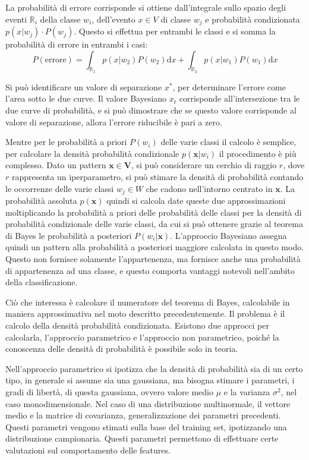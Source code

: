 \documentclass{article}
\numberwithin{equation}{subsection}
\newcommand{\vect}[1]{\boldsymbol{\mathbf{#1}}}
\begin{document}
La probabilità di errore corrisponde si ottiene dall'integrale sullo spazio degli eventi $\mathbb{R}_i$ della classe $w_i$, dell'evento $x\in V$ di classe $w_j$ e probabilità condizionata $p(x|w_j)\cdot P(w_j)$. Questo si effettua per entrambi le classi e si somma la probabilità di errore in entrambi i casi:
\begin{equation*}
    P(\text{errore})=\displaystyle\int_{\mathbb{R}_1}p(x|w_2)P(w_2)\text{d}x+\int_{\mathbb{R}_2}p(x|w_1)P(w_1)\text{d}x
\end{equation*}


Si può identificare un valore di separazione $x^*$, per determinare l'errore come l'area sotto le due curve. Il valore Bayesiano $x_t$ corrisponde all'intersezione tra le due curve di probabilità, e si può dimostrare che se questo valore corrisponde al valore di separazione, allora l'errore riducibile è pari a zero. 

Mentre per le probabilità a priori $P(w_i)$ delle varie classi il calcolo è semplice, 
per calcolare la densità probabilità condizionale $p(\vect{x}|w_i)$ il procedimento è più complesso. Dato un pattern $\vect{x}\in\vect{V}$, si può considerare un cerchio di raggio $r$, dove $r$ rappresenta un iperparametro, si può stimare la densità di probabilità contando le occorrenze delle varie classi $w_j\in W$ che cadono nell'intorno centrato in $\vect{x}$. 
La probabilità assoluta $p(\vect{x})$ quindi si calcola date queste due approssimazioni moltiplicando la probabilità a priori delle probabilità delle classi per la densità di probabilità condizionale delle varie classi, da cui si può 
ottenere grazie al teorema di Bayes le probabilità a posteriori $P(w_i|\vect{x})$. 
L'approccio Bayesiano assegna quindi un pattern alla probabilità a posteriori maggiore calcolata in questo modo. 
Questo non fornisce solamente l'appartenenza, ma fornisce anche una probabilità di appartenenza ad una classe, e questo comporta vantaggi notevoli nell'ambito della classificazione. 

Ciò che interessa è calcolare il numeratore del teorema di Bayes, calcolabile in maniera approssimativa nel moto descritto precedentemente. Il problema è il calcolo della densità probabilità condizionata. Esistono due approcci per calcolarla, l'approccio parametrico e l'approccio non parametrico, poiché la conoscenza delle densità di probabilità è possibile solo in teoria. 

Nell'approccio parametrico si ipotizza che la densità di probabilità sia di un certo tipo, 
in generale si assume sia una gaussiana, ma bisogna stimare i parametri, i gradi di libertà, di questa gaussiana, ovvero valore medio $\mu$ e la varianza $\sigma^2$, nel caso monodimensionale. Nel caso di una distribuzione multinormale, 
il vettore medio e la matrice di covarianza, generalizzazione dei parametri precedenti. Questi parametri vengono stimati sulla base del training set, ipotizzando una distribuzione campionaria. 
Questi parametri permettono di effettuare certe valutazioni sul comportamento delle features. 
\end{document}

